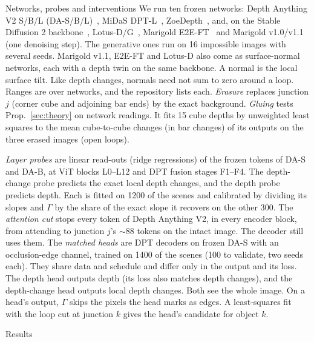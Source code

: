\documentclass[10pt,twocolumn,letterpaper]{article}
\makeatletter
\renewcommand\section{\@startsection{section}{1}{\z@}{-2.2ex \@plus -.5ex \@minus -.2ex}{1.1ex \@plus.2ex}%
  {\normalfont\Large\bfseries}}
\renewcommand\subsection{\@startsection{subsection}{2}{\z@}{-2ex\@plus -.5ex \@minus -.2ex}{.8ex \@plus .2ex}%
  {\normalfont\large\bfseries}}
\makeatother
\begin{document}
\subsection{Networks, probes and interventions}\label{sec:nets}
We run ten frozen networks: Depth Anything V2 S/B/L \mbox{(DA-S/B/L)}~\cite{yang2024dav2}, MiDaS
DPT-L~\cite{ranftl2021dpt,ranftl2022midas}, ZoeDepth~\cite{bhat2023zoedepth}, and, on the Stable Diffusion 2
backbone~\cite{rombach2022ldm}, Lotus-D/G~\cite{he2025lotus}, Marigold E2E-FT~\cite{garcia2025finetuning} and Marigold
v1.0/v1.1~\cite{ke2024marigold,ke2025marigold} (one denoising step). The generative ones run on 16 impossible images with several seeds. Marigold v1.1, E2E-FT and
Lotus-D also come as surface-normal networks, each with a depth twin on the same backbone. A normal is the local surface tilt. Like depth changes, normals need not
sum to zero around a loop. Ranges are over networks, and the repository lists each. \textit{Erasure} replaces junction
$j$ (corner cube and adjoining bar ends) by the exact background. \textit{Gluing} tests
Prop.~\ref{sec:theory} on network readings. It fits 15 cube depths by unweighted least squares to the mean
cube-to-cube changes (in bar changes) of its outputs on the three erased images (open loops).

\textit{Layer probes} are linear read-outs (ridge regressions) of the frozen tokens of DA-S and DA-B, at ViT blocks
L0--L12 and DPT fusion stages F1--F4. The depth-change probe predicts the exact local depth changes, and the depth
probe predicts depth. Each is fitted on 1200 of the scenes and calibrated by dividing its slopes and $\Gamma$ by the
share of the exact slope it recovers on the other 300. The \textit{attention cut} stops every token of Depth Anything
V2, in every encoder block, from attending to junction $j$'s ${\sim}88$ tokens on the intact image. The decoder still
uses them. The \textit{matched heads} are DPT decoders on frozen DA-S with an occlusion-edge channel, trained on 1400
of the scenes (100 to validate, two seeds each). They share data and schedule and differ only in the output and its
loss. The depth head outputs depth (its loss also matches depth changes), and the depth-change head outputs local
depth changes. Both see the whole image. On a head's
output, $\Gamma$ skips the pixels the head marks as edges. A least-squares fit with the loop cut at junction $k$ gives
the head's candidate for object $k$.

\section{Results}\label{sec:res}
\end{document}
